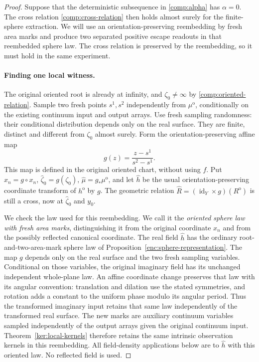 \documentclass[11pt]{article}
\numberwithin{equation}{section}
\theoremstyle{definition}
\theoremstyle{remark}
\newcommand{\1}{\mathbf 1}
\begin{document}
\begin{proof}
Suppose that the deterministic subsequence in
\eqref{comp:alpha} has $\alpha=0$.  The cross relation
\eqref{comp:cross-relation} then holds almost surely for the
finite-sphere extraction.  We will use an orientation-preserving
reembedding by fresh area marks and produce two separated positive
escape readouts in that reembedded sphere law.  The cross relation
is preserved by the reembedding, so it must hold in the same
experiment.

\paragraph{Finding one local witness.}
The original oriented root is already at infinity, and
$\zeta_0\ne\infty$ by \eqref{comp:oriented-relation}.  Sample two
fresh points $s^1,s^2$ independently from $\mu^{\mathrm o}$,
conditionally on the existing continuum input and output arrays.
Use fresh sampling randomness: their conditional distribution depends
only on the real surface.  They are finite, distinct and different
from $\zeta_0$ almost surely.  Form the orientation-preserving affine
map
\[
 g(z)=\frac{z-s^1}{s^2-s^1}.
\]
This map is defined in the original oriented chart, without using $f$.
Put $\widehat x_n=g\circ x_n$, $\widehat\zeta_0=g(\zeta_0)$,
$\widehat\mu=g_*\mu^{\mathrm o}$, and let $\widehat h$ be the usual
orientation-preserving coordinate transform of $h^{\mathrm o}$ by
$g$.  The geometric relation
$\widehat R=(\operatorname{id}_Y\times g)(R^{\mathrm o})$ is still a cross, now
at $\widehat\zeta_0$ and $y_0$.

We check the law used for this reembedding.  We call it the
\emph{oriented sphere law with fresh area marks}, distinguishing it
from the original coordinate $x_n$ and from the possibly reflected
canonical coordinate.  The real field $\widehat h$ has the ordinary
root-and-two-area-mark sphere law of
Proposition~\ref{enc:sphere-representation}.  The map $g$ depends
only on the real surface and the two fresh sampling variables.
Conditional on those variables, the original imaginary field has
its unchanged independent whole-plane law.  An affine coordinate
change preserves that law with its angular convention: translation
and dilation use the stated symmetries, and rotation adds a constant
to the uniform phase modulo its angular period.  Thus the transformed
imaginary input retains that same law independently of the transformed
real surface.  The new marks are auxiliary continuum variables
sampled independently of the output arrays given the original
continuum input.  Theorem~\ref{ker:local-kernels} therefore retains
the same intrinsic observation kernels in this reembedding.  All
field-density applications below are to $\widehat h$ with this
oriented law.  No reflected field is used.


\end{proof}
\end{document}
